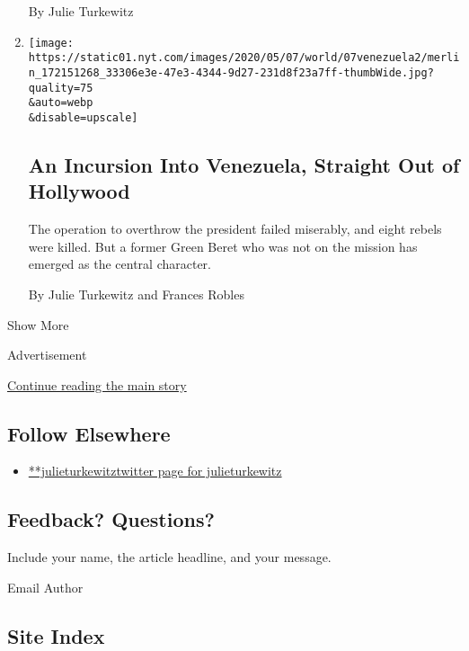\begin{enumerate}
  By Julie Turkewitz
\item
  \href{/2020/05/07/world/americas/venezuela-failed-overthrow.html}{}

  \texttt{[image: https://static01.nyt.com/images/2020/05/07/world/07venezuela2/merlin\_172151268\_33306e3e-47e3-4344-9d27-231d8f23a7ff-thumbWide.jpg?quality=75\\\&auto=webp\\\&disable=upscale]}

  \hypertarget{an-incursion-into-venezuela-straight-out-of-hollywood}{%
  \subsection{An Incursion Into Venezuela, Straight Out of
  Hollywood}\label{an-incursion-into-venezuela-straight-out-of-hollywood}}

  The operation to overthrow the president failed miserably, and eight
  rebels were killed. But a former Green Beret who was not on the
  mission has emerged as the central character.

  By Julie Turkewitz and Frances Robles
\end{enumerate}

Show More

Advertisement

\protect\hyperlink{after-mid2}{Continue reading the main story}

\hypertarget{follow-elsewhere}{%
\subsection{Follow Elsewhere}\label{follow-elsewhere}}

\begin{itemize}
\tightlist
\item
  \href{https://twitter.com/julieturkewitz}{**julieturkewitztwitter page
  for julieturkewitz}
\end{itemize}

\hypertarget{feedback-questions}{%
\subsection{Feedback? Questions?}\label{feedback-questions}}

Include your name, the article headline, and your message.

Email Author

\hypertarget{site-index}{%
\subsection{Site Index}\label{site-index}}

